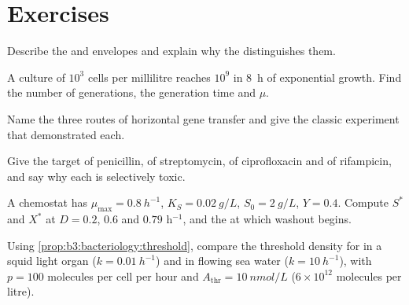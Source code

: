 \section{Exercises}

\begin{exercise}[$\star$]\label{exo:b3:bacteriology:1}
Describe the  and  envelopes and explain why
the  distinguishes them.
\end{exercise}

\begin{exercise}[$\star$]\label{exo:b3:bacteriology:2}
A culture of $10^{3}$ cells per millilitre reaches $10^{9}$ in
\qty{8}{h} of exponential growth. Find the number of generations, the
generation time and $\mu$.
\end{exercise}

\begin{exercise}[$\star$]\label{exo:b3:bacteriology:3}
Name the three routes of horizontal gene transfer and give the classic
experiment that demonstrated each.
\end{exercise}

\begin{exercise}[$\star$]\label{exo:b3:bacteriology:4}
Give the target of penicillin, of streptomycin, of ciprofloxacin and of
rifampicin, and say why each is selectively toxic.
\end{exercise}

\begin{exercise}[$\star\star$]\label{exo:b3:bacteriology:5}
A chemostat has $\mu_{\max} = \qty{0.8}{h^{-1}}$, $K_{S} =
\qty{0.02}{g/L}$, $S_{0} = \qty{2}{g/L}$, $Y = 0.4$. Compute $S^{*}$ and
$X^{*}$ at $D = 0.2$, $0.6$ and $0.79$ h$^{-1}$, and the 
at which washout begins.
\end{exercise}

\begin{exercise}[$\star\star$]\label{exo:b3:bacteriology:6}
Using \cref{prop:b3:bacteriology:threshold}, compare the threshold
density for  in a squid light organ ($k =
\qty{0.01}{h^{-1}}$) and in flowing sea water ($k = \qty{10}{h^{-1}}$),
with $p = 100$ molecules per cell per hour and $A_{\text{thr}} =
\qty{10}{nmol/L}$ ($6\times 10^{12}$ molecules per litre).
\end{exercise}

